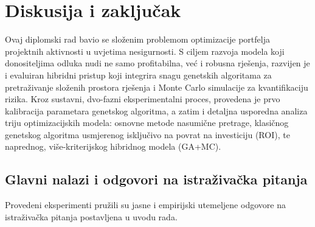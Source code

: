 \section{Diskusija i zaključak}
\label{chap:zakljucak}

Ovaj diplomski rad bavio se složenim problemom optimizacije portfelja projektnih aktivnosti u uvjetima nesigurnosti. S ciljem razvoja modela koji donositeljima odluka nudi ne samo profitabilna, već i robusna rješenja, razvijen je i evaluiran hibridni pristup koji integrira snagu genetskih algoritama za pretraživanje složenih prostora rješenja i Monte Carlo simulacije za kvantifikaciju rizika. Kroz sustavni, dvo-fazni eksperimentalni proces, provedena je prvo kalibracija parametara genetskog algoritma, a zatim i detaljna usporedna analiza triju optimizacijskih modela: osnovne metode nasumične pretrage, klasičnog genetskog algoritma usmjerenog isključivo na povrat na investiciju (ROI), te naprednog, više-kriterijskog hibridnog modela (GA+MC).

\subsection{Glavni nalazi i odgovori na istraživačka pitanja}
Provedeni eksperimenti pružili su jasne i empirijski utemeljene odgovore na istraživačka pitanja postavljena u uvodu rada.

